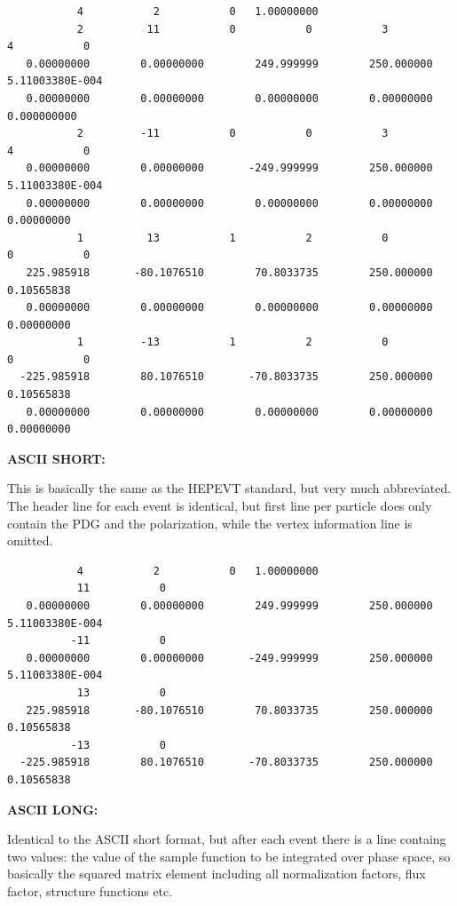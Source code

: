 \documentclass[12pt]{book}
\begin{document}
\begin{scriptsize}
  \begin{verbatim}
           4           2           0   1.00000000
           2          11           0           0           3           4           0
   0.00000000        0.00000000        249.999999        250.000000       5.11003380E-004
   0.00000000        0.00000000        0.00000000        0.00000000       0.000000000
           2         -11           0           0           3           4           0
   0.00000000        0.00000000       -249.999999        250.000000       5.11003380E-004
   0.00000000        0.00000000        0.00000000        0.00000000       0.00000000
           1          13           1           2           0           0           0
   225.985918       -80.1076510        70.8033735        250.000000       0.10565838
   0.00000000        0.00000000        0.00000000        0.00000000       0.00000000
           1         -13           1           2           0           0           0
  -225.985918        80.1076510       -70.8033735        250.000000       0.10565838
   0.00000000        0.00000000        0.00000000        0.00000000       0.00000000    
  \end{verbatim}
\end{scriptsize}

{\bf ASCII SHORT:}

This is basically the same as the HEPEVT standard, but very much
abbreviated. The header line for each event is identical, but first
line per particle does only contain the PDG and the polarization,
while the vertex information line is omitted.

\begin{scriptsize}
  \begin{verbatim}
           4           2           0   1.00000000
           11           0
   0.00000000        0.00000000        249.999999        250.000000       5.11003380E-004
          -11           0
   0.00000000        0.00000000       -249.999999        250.000000       5.11003380E-004
           13           0
   225.985918       -80.1076510        70.8033735        250.000000       0.10565838
          -13           0
  -225.985918        80.1076510       -70.8033735        250.000000       0.10565838
  \end{verbatim}
\end{scriptsize}

{\bf ASCII LONG:}

Identical to the ASCII short format, but after each event there is a
line containg two values: the value of the sample function to be
integrated over phase space, so basically the squared matrix element
including all normalization factors, flux factor, structure functions
etc. 
\end{document}

